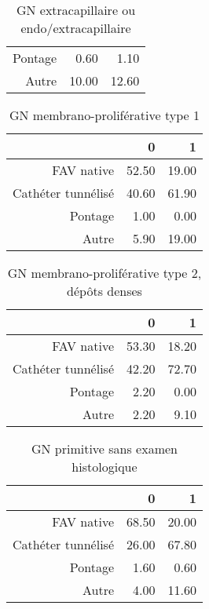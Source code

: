 \documentclass[11pt,a4paper]{article}\usepackage[]{graphicx}\usepackage[]{color}
\begin{document}
\begin{multicols}{2}
\begin{table}[H]
\begin{tabular}{rrr}
  Pontage & 0.60 & 1.10 \\ 
  Autre & 10.00 & 12.60 \\ 
   \hline
\end{tabular}
\caption{GN extracapillaire ou endo/extracapillaire} 
\end{table}
\begin{table}[H]
\centering
\begin{tabular}{rrr}
  \hline
 & 0 & 1 \\ 
  \hline
FAV native & 52.50 & 19.00 \\ 
  Cathéter tunnélisé & 40.60 & 61.90 \\ 
  Pontage & 1.00 & 0.00 \\ 
  Autre & 5.90 & 19.00 \\ 
   \hline
\end{tabular}
\caption{GN membrano-proliférative type 1} 
\end{table}
\begin{table}[H]
\centering
\begin{tabular}{rrr}
  \hline
 & 0 & 1 \\ 
  \hline
FAV native & 53.30 & 18.20 \\ 
  Cathéter tunnélisé & 42.20 & 72.70 \\ 
  Pontage & 2.20 & 0.00 \\ 
  Autre & 2.20 & 9.10 \\ 
   \hline
\end{tabular}
\caption{GN membrano-proliférative type 2, dépôts denses} 
\end{table}
\begin{table}[H]
\centering
\begin{tabular}{rrr}
  \hline
 & 0 & 1 \\ 
  \hline
FAV native & 68.50 & 20.00 \\ 
  Cathéter tunnélisé & 26.00 & 67.80 \\ 
  Pontage & 1.60 & 0.60 \\ 
  Autre & 4.00 & 11.60 \\ 
   \hline
\end{tabular}
\caption{GN primitive sans examen histologique} 
\end{table}

\end{multicols}
\end{document}
